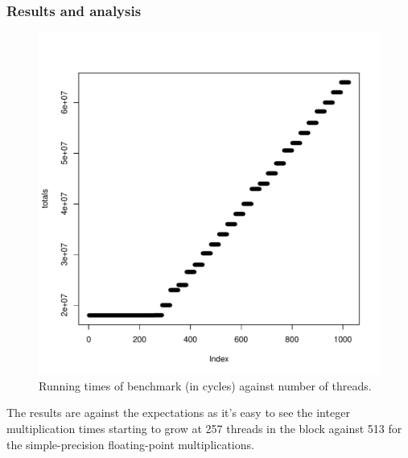 \documentclass{article}
\def \scalingfactor{.8}
\begin{document}
	\subsubsection{Results and analysis}
    \begin{figure}[h]
    	\centering
		\vspace{-20pt}
	    \includegraphics[width=\scalingfactor\linewidth]{"graphics/running_times"}
		\vspace{-15pt}
		\captionsetup{justification=centering}
        \caption{Running times of benchmark (in cycles) against number of threads.}
    \end{figure}
	
    The results are against the expectations as it's easy to see the integer
    multiplication times starting to grow at 257 threads in the block against
    513 for the simple-precision floating-point multiplications.
    
\end{document}
